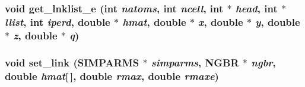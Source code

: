 \subsubsection{\setlength{\rightskip}{0pt plus 5cm}void get\_\-lnklist\_\-e (int {\em natoms}, int {\em ncell}, int $\ast$ {\em head}, int $\ast$ {\em llist}, int {\em iperd}, double $\ast$ {\em hmat}, double $\ast$ {\em x}, double $\ast$ {\em y}, double $\ast$ {\em z}, double $\ast$ {\em q})}\label{set__link_8c_9f6f52ca3256c3852f909b9e516e6db7}


\subsubsection{\setlength{\rightskip}{0pt plus 5cm}void set\_\-link ({\bf SIMPARMS} $\ast$ {\em simparms}, {\bf NGBR} $\ast$ {\em ngbr}, double {\em hmat}[$\,$], double {\em rmax}, double {\em rmaxe})}\label{set__link_8c_38895ff4cb320cf5b4f08b3cfa1f819a}


